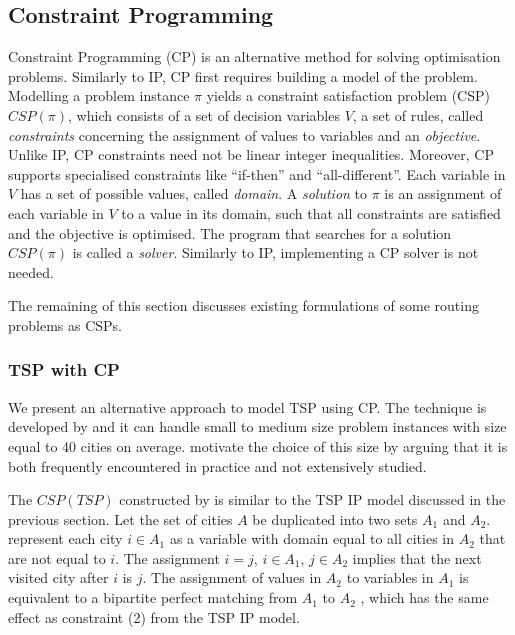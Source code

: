 \documentclass{mpaper}
\begin{document}
\subsection{Constraint Programming}
\label{sec:cp}
Constraint Programming (CP) is an alternative method for solving optimisation problems. Similarly to IP, CP first requires building a model of the problem. Modelling a problem instance $\pi$ yields a constraint satisfaction problem (CSP) $CSP(\pi)$, which consists of a set of decision variables $V$, a set of rules, called \textit{constraints} concerning the assignment of values to variables and an \textit{objective}. Unlike IP, CP constraints need not be linear integer inequalities. Moreover, CP supports specialised constraints like ``if-then'' and ``all-different''. Each variable in $V$ has a set of possible values, called \textit{domain}. A \textit{solution} to $\pi$ is an assignment of each variable in $V$ to a value in its domain, such that all constraints are satisfied and the objective is optimised. The program that searches for a solution $CSP(\pi)$ is called a \textit{solver}. Similarly to IP, implementing a CP solver is not needed.

The remaining of this section discusses existing formulations of some routing problems as CSPs.

\subsubsection*{TSP with CP}
We present an alternative approach to model TSP using CP. The technique is developed by \citet{Caseau97} and it can handle small to medium size problem instances with size equal to 40 cities on average. \citet{Caseau97} motivate the choice of this size by arguing that it is both frequently encountered in practice and not extensively studied.

The $CSP(TSP)$ constructed by \citet{Caseau97} is similar to the TSP IP model discussed in the previous section. Let the set of cities $A$ be duplicated into two sets $A_1$ and $A_2$. \citet{Caseau97} represent each city $i \in A_1$ as a variable with domain equal to all cities in $A_2$ that are not equal to $i$. The assignment $i = j$, $i \in A_1$, $j \in A_2$ implies that the next visited city after $i$ is $j$. The assignment of values in $A_2$ to variables in $A_1$ is equivalent to a bipartite perfect matching from $A_1$ to $A_2$ \cite{Caseau97}, which has the same effect as constraint (2) from the TSP IP model.
\end{document}
